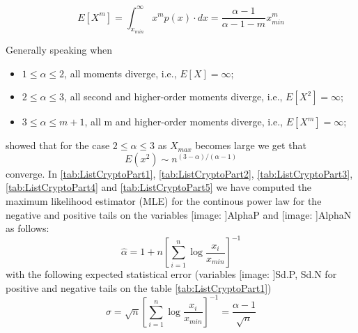 \documentclass{bmcart}
\def\texttt{[image: ]}
\begin{document}

\begin{equation}
	E\left[X^m \right]= \int_{x_{min}}^{\infty}x^mp(x)\cdot dx = \frac{\alpha - 1}{\alpha-1-m}x_{min}^m
\end{equation}


Generally speaking when
\begin{itemize}
	\item $1 \le \alpha \leq 2$, all moments diverge, i.e., $E[X]=\infty$;
	\item $2 \le \alpha \leq 3$, all second and higher-order moments diverge, i.e., $E[X^2]=\infty$;
	\item $3 \le \alpha \leq m+1$, all m and higher-order moments diverge, i.e., $E[X^m]=\infty$;
\end{itemize}


	
\cite{Newman2005power} showed that for the case $2 \le \alpha \leq 3$ as $X_{max}$ becomes large we get that
\begin{equation}
	E\left( x^2 \right) \sim n^{(3-\alpha)/(\alpha-1)}
\end{equation}
converge. In \ref{tab:ListCryptoPart1}, \ref{tab:ListCryptoPart2}, \ref{tab:ListCryptoPart3}, \ref{tab:ListCryptoPart4} and \ref{tab:ListCryptoPart5} we have computed the maximum likelihood estimator (MLE) for the continous power law for the negative and positive tails on the variables \texttt{AlphaP} and \texttt{AlphaN}  as follows:
\begin{equation}
	\hat{\alpha} = 1 + n\left[ \sum_{i=1}^{n}\log \frac{x_i}{x_{min}} \right]^{-1}
\end{equation}
with the following expected statistical error (variables \texttt{Sd.P, Sd.N} for positive and negative tails on the table \ref{tab:ListCryptoPart1})
\begin{equation}
	\sigma = \sqrt{n}\left[ \sum_{i=1}^{n}\log\frac{x_i}{x_{min}} \right]^{-1} = \frac{\alpha-1}{\sqrt{n}}
\end{equation}


\end{document}

